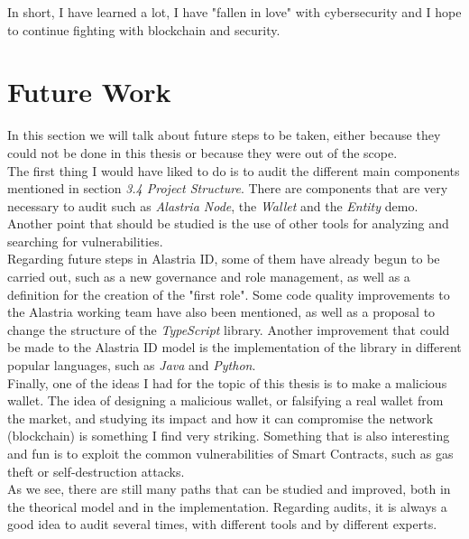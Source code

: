 \documentclass[a4paper, 12pt]{article} %
\begin{document}
    In short, I have learned a lot, I have "fallen in love" with cybersecurity and I hope to continue fighting with blockchain and security.
    
\newpage
\section{Future Work}
    In this section we will talk about future steps to be taken, either because they could not be done in this thesis or because they were out of the scope.\\
    
    The first thing I would have liked to do is to audit the different main components mentioned in section \textit{3.4 Project Structure}. There are components that are very necessary to audit such as \textit{Alastria Node}, the \textit{Wallet} and the \textit{Entity} demo. Another point that should be studied is the use of other tools for analyzing and searching for vulnerabilities.\\
    
    Regarding future steps in Alastria ID, some of them have already begun to be carried out, such as a new governance and role management, as well as a definition for the creation of the "first role". Some code quality improvements to the Alastria working team have also been mentioned, as well as a proposal to change the structure of the \textit{TypeScript} library. Another improvement that could be made to the Alastria ID model is the implementation of the library in different popular languages, such as \textit{Java} and \textit{Python}.\\
    
    Finally, one of the ideas I had for the topic of this thesis is to make a malicious wallet. The idea of designing a malicious wallet, or falsifying a real wallet from the market, and studying its impact and how it can compromise the network (blockchain) is something I find very striking. Something that is also interesting and fun is to exploit the common vulnerabilities of Smart Contracts, such as gas theft or self-destruction attacks.\\
    
    As we see, there are still many paths that can be studied and improved, both in the theorical model and in the implementation. Regarding audits, it is always a good idea to audit several times, with different tools and by different experts.
    
\newpage
\printbibliography[heading=bibnumbered] %
\end{document}

